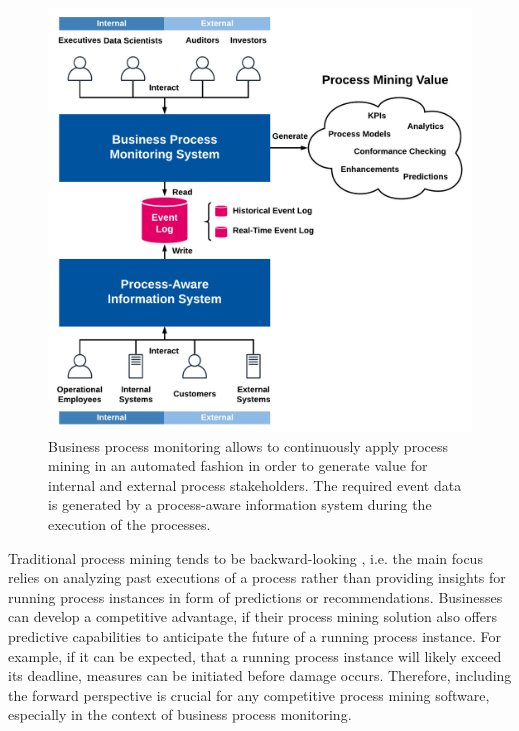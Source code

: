 \begin{figure}[htbp!]
	\centering
	\includegraphics[width=\textwidth]{figures/process-monitoring}
	\caption[Process mining in the context of business process monitoring]{Business process monitoring allows to continuously apply process mining in an automated fashion in order to generate value for internal and external process stakeholders. The required event data is generated by a process-aware information system during the execution of the processes.}
	\label{fig:process-monitoring}
\end{figure}

Traditional process mining tends to be backward-looking \cite{DBLP:conf/scsc/Aalst18}, i.e. the main focus relies on analyzing past executions of a process rather than providing insights for running process instances in form of predictions or recommendations.
Businesses can develop a competitive advantage, if their process mining solution also offers predictive capabilities to anticipate the future of a running process instance.
For example, if it can be expected, that a running process instance will likely exceed its deadline, measures can be initiated before damage occurs.
Therefore, including the forward perspective is crucial for any competitive process mining software, especially in the context of business process monitoring.

